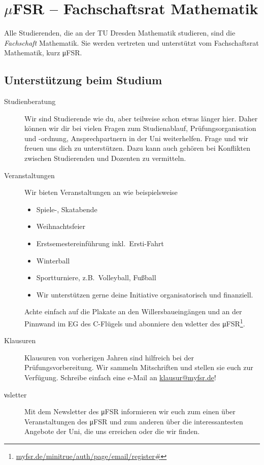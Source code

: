 \documentclass{scrartcl}
\begin{document}
\newcommand{\keyword}{\emph}
\section{\texorpdfstring{$\mu$}{my}FSR -- Fachschaftsrat Mathematik}
Alle Studierenden, die an der TU Dresden Mathematik studieren, sind die \keyword{Fachschaft} Mathematik.
Sie werden vertreten und unterstützt vom Fachschaftsrat Mathematik, kurz μFSR.

\subsection{Unterstützung beim Studium}
\label{sub:unterstutzung_beim_studium}
\begin{description}
  \item[Studienberatung] Wir sind Studierende wie du, aber teilweise schon etwas länger hier.
    Daher können wir dir bei vielen Fragen zum Studienablauf, Prüfungsorganisation und -ordnung, Ansprechpartnern in der Uni weiterhelfen.
    Frage und wir freuen uns dich zu unterstützen.
    Dazu kann auch gehören bei Konflikten zwischen Studierenden und Dozenten zu vermitteln.
  \item[Veranstaltungen] Wir bieten Veranstaltungen an wie beispielsweise
    \begin{itemize}
      \item Spiele-, Skatabende
      \item Weihnachtsfeier
      \item Erstsemestereinführung inkl.\ Ersti-Fahrt
      \item Winterball
      \item Sportturniere, z.B.\ Volleyball, Fußball
      \item Wir unterstützen gerne deine Initiative organisatorisch und finanziell.
    \end{itemize}
    Achte einfach auf die Plakate an den Willersbaueingängen und an der Pinnwand im EG des C-Flügels und
    abonniere den νsletter des μFSR\footnote{\url{myfsr.de/minitrue/auth/page/email/register#}}.
  \item[Klausuren] Klausuren von vorherigen Jahren sind hilfreich bei der Prüfungsvorbereitung.
    Wir sammeln Mitschriften und stellen sie euch zur Verfügung.
    Schreibe einfach eine e-Mail an \url{klausur@myfsr.de}!
  \item[νsletter] Mit dem Newsletter des μFSR informieren wir euch zum einen über
    Veranstaltungen des μFSR und zum anderen über die interessantesten Angebote der Uni,
    die uns erreichen oder die wir finden.
\end{description}
\end{document}
